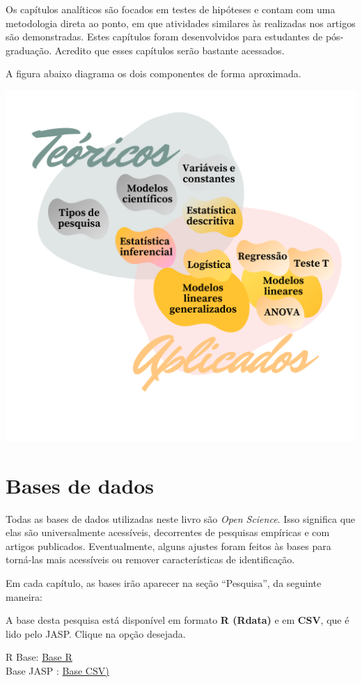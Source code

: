 \documentclass[
]{book}
\begin{document}
Os capítulos analíticos são focados em testes de hipóteses e contam com
uma metodologia direta ao ponto, em que atividades similares às
realizadas nos artigos são demonstradas. Estes capítulos foram
desenvolvidos para estudantes de pós-graduação. Acredito que esses
capítulos serão bastante acessados.

A figura abaixo diagrama os dois componentes de forma aproximada.

\includegraphics{./img/proposta.png}

\hypertarget{bases-de-dados}{%
\section{Bases de dados}\label{bases-de-dados}}

Todas as bases de dados utilizadas neste livro são \emph{Open Science}.
Isso significa que elas são universalmente acessíveis, decorrentes de
pesquisas empíricas e com artigos publicados. Eventualmente, alguns
ajustes foram feitos às bases para torná-las mais acessíveis ou remover
características de identificação.

Em cada capítulo, as bases irão aparecer na seção ``Pesquisa'', da
seguinte maneira:

\begin{base}

A base desta pesquisa está disponível em formato \textbf{R (Rdata)} e em
\textbf{CSV}, que é lido pelo JASP. Clique na opção desejada.

R Base: \href{}{Base R}\\
Base JASP : \href{}{Base CSV)}

\end{base}
\end{document}
